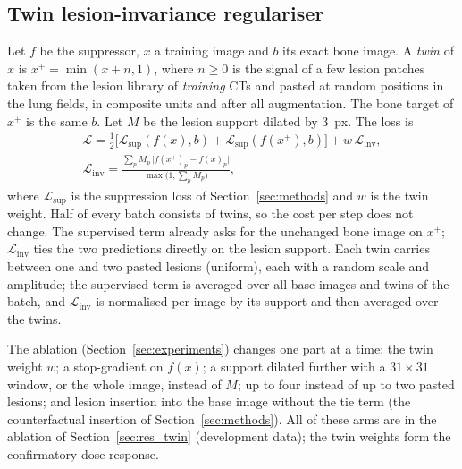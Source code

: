 \subsection{Twin lesion-invariance regulariser}
Let $f$ be the suppressor, $x$ a training image and $b$ its exact bone image. A \emph{twin} of $x$ is $x^{+}=\min(x+n,1)$, where $n\ge0$ is the
signal of a few lesion patches taken from the lesion library of \emph{training} CTs and pasted at random positions in the lung fields, in composite
units and after all augmentation. The bone target of $x^{+}$ is the same $b$. Let $M$ be the lesion support dilated by $3$~px. The loss is
\begin{equation}
\begin{gathered}
\mathcal{L}=\tfrac12\big[\mathcal{L}_{\mathrm{sup}}(f(x),b)+\mathcal{L}_{\mathrm{sup}}(f(x^{+}),b)\big]+w\,\mathcal{L}_{\mathrm{inv}},\\
\mathcal{L}_{\mathrm{inv}}=\frac{\sum_p M_p\,\big|f(x^{+})_p-f(x)_p\big|}{\max\big(1,\sum_p M_p\big)},
\end{gathered}
\label{eq:twin}
\end{equation}
where $\mathcal{L}_{\mathrm{sup}}$ is the suppression loss of Section~\ref{sec:methods} and $w$ is the twin weight. Half of every batch consists of twins, so
the cost per step does not change. The supervised term already asks for the unchanged bone image on $x^{+}$; $\mathcal{L}_{\mathrm{inv}}$ ties the
two predictions directly on the lesion support. Each twin carries between one and two pasted lesions (uniform), each with a random scale and
amplitude; the supervised term is averaged over all base images and twins of the batch, and $\mathcal{L}_{\mathrm{inv}}$ is normalised per image by
its support and then averaged over the twins.

The ablation (Section~\ref{sec:experiments}) changes one part at a time: the twin weight $w$; a stop-gradient on $f(x)$; a support dilated further with a
$31\times31$ window, or the whole image, instead of $M$; up to four instead of up to two pasted lesions; and lesion insertion into the base image
without the tie term (the counterfactual insertion of Section~\ref{sec:methods}). All of these arms are in the ablation of
Section~\ref{sec:res_twin} (development data); the twin weights form the confirmatory dose-response.

